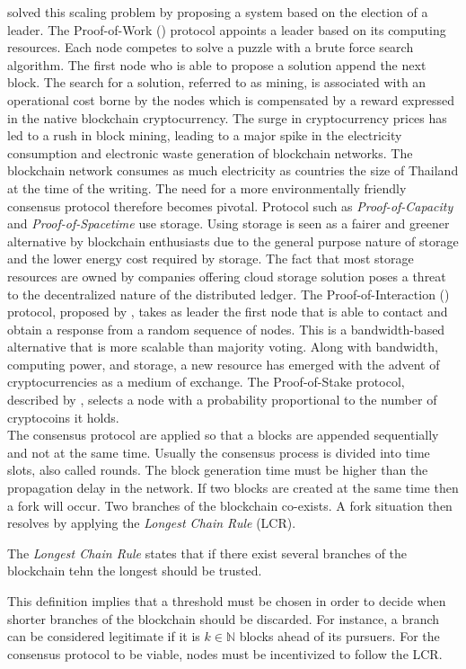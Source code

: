 \noindent \citet{Na08} solved this scaling problem by proposing a system based on the election of a leader. The Proof-of-Work (\PoW) protocol appoints a leader based on its computing resources. Each node competes to solve a puzzle with a brute force search algorithm. The first node who is able to propose a solution append the next block. The search for a solution, referred to as mining, is associated with an operational cost borne by the nodes which is compensated by a reward expressed in the native blockchain cryptocurrency. The surge in cryptocurrency prices has led to a rush in block mining, leading to a major spike in the electricity consumption and electronic waste generation of blockchain networks. The blockchain network consumes as much electricity as countries the size of Thailand at the time of the writing. The need for a more environmentally friendly consensus protocol therefore becomes pivotal. Protocol such as \textit{Proof-of-Capacity} and \textit{Proof-of-Spacetime} use storage. Using storage is seen as a fairer and greener alternative by blockchain enthusiasts due to the general purpose nature of storage and the lower energy cost required by storage. The fact that most storage resources are owned by companies offering cloud storage solution poses a threat to the decentralized nature of the distributed ledger. The Proof-of-Interaction (\PoI) protocol, proposed by \citet{Abegg2021}, takes as leader the first node that is able to contact and obtain a response from a random sequence of nodes. This is a bandwidth-based alternative that is more scalable than majority voting. Along with bandwidth, computing power, and storage, a new resource has emerged with the advent of cryptocurrencies as a medium of exchange. The Proof-of-Stake protocol, described by \citet{Saleh2020}, selects a node with a probability proportional to the number of cryptocoins it holds. \\

\noindent The consensus protocol are applied so that a blocks are appended sequentially and not at the same time. Usually the consensus process is divided into time slots, also called rounds. The block generation time must be higher than the propagation delay in the network. If two blocks are created at the same time then a fork will occur. Two branches of the blockchain co-exists. A fork situation then resolves by applying the \textit{Longest Chain Rule} (LCR).
\begin{definition}
The \textit{Longest Chain Rule} states that if there exist several branches of the blockchain tehn the longest should be trusted.
\end{definition}  
\noindent This definition implies that a threshold must be chosen in order to decide when shorter branches of the blockchain should be discarded. For instance, a branch can be considered legitimate if it is $k\in\mathbb{N}$ blocks ahead of its pursuers.
For the consensus protocol to be viable, nodes must be incentivized to follow the LCR.\\

